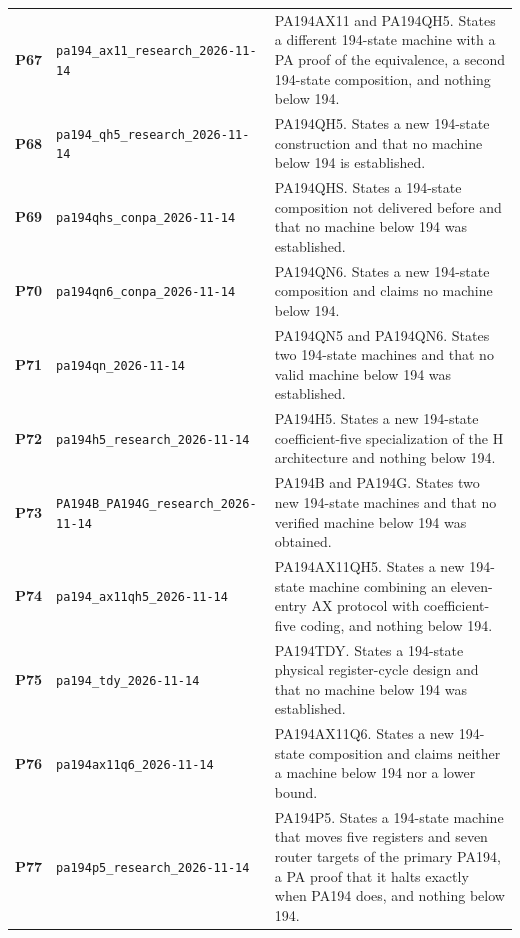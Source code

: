 \begin{longtable}{@{}>{\raggedright\arraybackslash}p{.055\linewidth}>{\raggedright\arraybackslash}p{.355\linewidth}>{\raggedright\arraybackslash}p{.55\linewidth}@{}}
\hypertarget{packet-P67}{\textbf{P67}} & \nolinkurl{pa194_ax11_research_2026-11-14} & PA194AX11 and PA194QH5. States a different 194-state machine with a PA proof of the equivalence, a second 194-state composition, and nothing below 194.\\[3pt]
\hypertarget{packet-P68}{\textbf{P68}} & \nolinkurl{pa194_qh5_research_2026-11-14} & PA194QH5. States a new 194-state construction and that no machine below 194 is established.\\[3pt]
\hypertarget{packet-P69}{\textbf{P69}} & \nolinkurl{pa194qhs_conpa_2026-11-14} & PA194QHS. States a 194-state composition not delivered before and that no machine below 194 was established.\\[3pt]
\hypertarget{packet-P70}{\textbf{P70}} & \nolinkurl{pa194qn6_conpa_2026-11-14} & PA194QN6. States a new 194-state composition and claims no machine below 194.\\[3pt]
\hypertarget{packet-P71}{\textbf{P71}} & \nolinkurl{pa194qn_2026-11-14} & PA194QN5 and PA194QN6. States two 194-state machines and that no valid machine below 194 was established.\\[3pt]
\hypertarget{packet-P72}{\textbf{P72}} & \nolinkurl{pa194h5_research_2026-11-14} & PA194H5. States a new 194-state coefficient-five specialization of the H architecture and nothing below 194.\\[3pt]
\hypertarget{packet-P73}{\textbf{P73}} & \nolinkurl{PA194B_PA194G_research_2026-11-14} & PA194B and PA194G. States two new 194-state machines and that no verified machine below 194 was obtained.\\[3pt]
\hypertarget{packet-P74}{\textbf{P74}} & \nolinkurl{pa194_ax11qh5_2026-11-14} & PA194AX11QH5. States a new 194-state machine combining an eleven-entry AX protocol with coefficient-five coding, and nothing below 194.\\[3pt]
\hypertarget{packet-P75}{\textbf{P75}} & \nolinkurl{pa194_tdy_2026-11-14} & PA194TDY. States a 194-state physical register-cycle design and that no machine below 194 was established.\\[3pt]
\hypertarget{packet-P76}{\textbf{P76}} & \nolinkurl{pa194ax11q6_2026-11-14} & PA194AX11Q6. States a new 194-state composition and claims neither a machine below 194 nor a lower bound.\\[3pt]
\hypertarget{packet-P77}{\textbf{P77}} & \nolinkurl{pa194p5_research_2026-11-14} & PA194P5. States a 194-state machine that moves five registers and seven router targets of the primary PA194, a PA proof that it halts exactly when PA194 does, and nothing below 194.\\[3pt]

\end{longtable}

